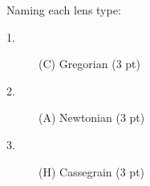 Naming each lens type: %
\begin{description}
\item[1.] (C) Gregorian \hfill(3 pt)
\item[2.] (A) Newtonian \hfill(3 pt)
\item[3.] (H) Cassegrain \hfill(3 pt)
\end{description}
